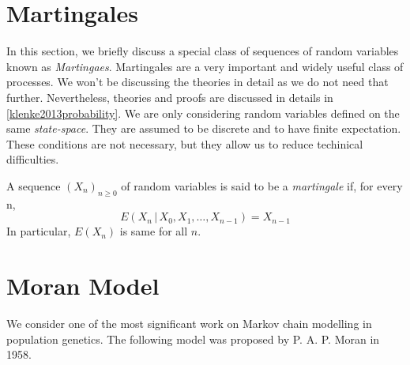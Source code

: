 \section{Martingales}
In this section, we briefly discuss a special class of sequences of random variables known as \emph{Martingaes}. Martingales are a very important and widely useful class of processes. We won't be discussing the theories in detail as we do not need that further. Nevertheless, theories and proofs are discussed in details in \ref{klenke2013probability}.
\newline
We are only considering random variables defined on the same \emph{state-space}. They are assumed to be discrete and to have finite expectation. These conditions are not necessary, but they allow us to reduce techinical difficulties.
\begin{defn}
  A sequence $(X_{n})_{n \geq 0}$ of random variables is said to be a \emph{martingale} if, for every n,
  \[E(X_{n}\,|\,X_{0},X_{1},\ldots,X_{n-1}) = X_{n-1}\]
  In particular, $E(X_{n})$ is same for all $n$.
\end{defn}

\section{Moran Model}
We consider one of the most significant work on Markov chain modelling in population genetics. The following model was proposed by P. A. P. Moran in 1958.
